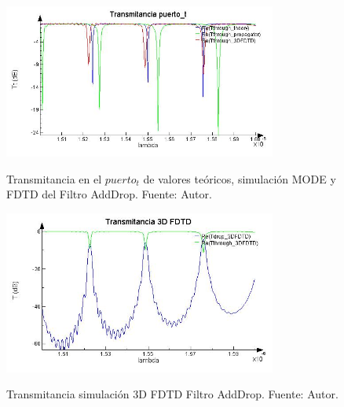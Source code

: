 \begin{figure}[H]
\caption{Transmitancia en el $puerto_t$ de valores teóricos, simulación MODE y 
FDTD del Filtro AddDrop. Fuente: Autor.}
\centering
\includegraphics[width=0.8\textwidth,natwidth=632,natheight=356]{figs/lum_Tt.jpg}
\label{fig:lum_tt_ad}
\end{figure} 

\begin{figure}[H]
\caption{Transmitancia simulación 3D FDTD Filtro AddDrop. Fuente: Autor.}
\centering
\includegraphics[width=0.8\textwidth,natwidth=598,natheight=356]{figs/lum_T_FDTD.jpg}
\label{fig:lum_t_fdtd_ad}
\end{figure} 

